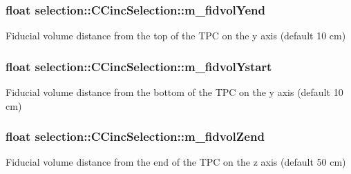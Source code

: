 \subsubsection[{\texorpdfstring{m\+\_\+fidvol\+Yend}{m_fidvolYend}}]{\setlength{\rightskip}{0pt plus 5cm}float selection\+::\+C\+Cinc\+Selection\+::m\+\_\+fidvol\+Yend\hspace{0.3cm}{\ttfamily [private]}}\hypertarget{classselection_1_1CCincSelection_a01d6a0608356e4ea245f23e1b6934fd3}{}\label{classselection_1_1CCincSelection_a01d6a0608356e4ea245f23e1b6934fd3}
Fiducial volume distance from the top of the T\+PC on the y axis (default 10 cm) 
\subsubsection[{\texorpdfstring{m\+\_\+fidvol\+Ystart}{m_fidvolYstart}}]{\setlength{\rightskip}{0pt plus 5cm}float selection\+::\+C\+Cinc\+Selection\+::m\+\_\+fidvol\+Ystart\hspace{0.3cm}{\ttfamily [private]}}\hypertarget{classselection_1_1CCincSelection_a28900415eda1eb30d6263081e943e6a5}{}\label{classselection_1_1CCincSelection_a28900415eda1eb30d6263081e943e6a5}
Fiducial volume distance from the bottom of the T\+PC on the y axis (default 10 cm) 
\subsubsection[{\texorpdfstring{m\+\_\+fidvol\+Zend}{m_fidvolZend}}]{\setlength{\rightskip}{0pt plus 5cm}float selection\+::\+C\+Cinc\+Selection\+::m\+\_\+fidvol\+Zend\hspace{0.3cm}{\ttfamily [private]}}\hypertarget{classselection_1_1CCincSelection_a2510a29ed7584b2d56eb8dff636ceee6}{}\label{classselection_1_1CCincSelection_a2510a29ed7584b2d56eb8dff636ceee6}
Fiducial volume distance from the end of the T\+PC on the z axis (default 50 cm) 
